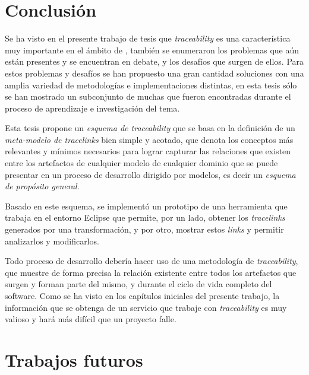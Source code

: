 \documentclass[a4paper,12pt,oneside,spanish]{book}
\begin{document}
\backmatter

\lhead[]{\leftmark}

\chapter{Conclusión}

Se ha visto en el presente trabajo de tesis que \textit{traceability} es una característica muy importante en el ámbito de , también se enumeraron los problemas que aún están presentes y se encuentran en debate, y los desafíos que surgen de ellos. Para estos problemas y desafíos se han propuesto una gran cantidad soluciones con una amplia variedad de metodologías e implementaciones distintas, en esta tesis sólo se han mostrado un subconjunto de muchas que fueron encontradas durante el proceso de aprendizaje e investigación del tema.

Esta tesis propone un \textit{esquema de traceability} que se basa en la definición de un \textit{meta-modelo de tracelinks} bien simple y acotado, que denota los conceptos más relevantes y mínimos necesarios para lograr capturar las relaciones que existen entre los artefactos de cualquier modelo de cualquier dominio que se puede presentar en un proceso de desarrollo dirigido por modelos, es decir un \textit{esquema de propósito general}.

Basado en este esquema, se implementó un prototipo de una herramienta que trabaja en el entorno \textsf{Eclipse} que permite, por un lado, obtener los \textit{tracelinks} generados por una transformación, y por otro, mostrar estos \textit{links} y permitir analizarlos y modificarlos.

Todo proceso de desarrollo debería hacer uso de una metodología de \textit{traceability}, que muestre de forma precisa la relación existente entre todos los artefactos que surgen y forman parte del mismo, y durante el ciclo de vida completo del software. Como se ha visto en los capítulos iniciales del presente trabajo, la información que se obtenga de un servicio que trabaje con \textit{traceability} es muy valioso y hará más difícil que un proyecto falle.





\chapter{Trabajos futuros}
\end{document}
